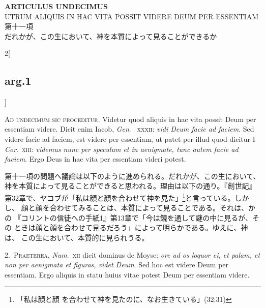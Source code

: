 \documentclass[paper=a4paper,fontsize=10pt,jafontsize=9pt,titlepage]{jlreq}
\begin{document}
\newpage
{}

\begin{center}
 {\Large {\bfseries ARTICULUS UNDECIMUS}}\\
 {\large UTRUM ALIQUIS IN HAC VITA POSSIT VIDERE DEUM PER ESSENTIAM\\
第十一項\\
だれかが、この生において、神を本質によって見ることができるか}
\end{center}

{}
\setcounter{section}{11}
\setcounter{subsection}{0}

\begin{paracol}{2}[\subsection{arg.1}]

{\scshape Ad undecimum sic proceditur}. Videtur quod aliquis in hac vita
possit Deum per essentiam videre. Dicit enim Iacob, {\itshape Gen}.~{\scshape
xxxii}: {\itshape vidi Deum facie ad faciem}. Sed videre facie ad faciem,
est videre per essentiam, ut patet per illud quod dicitur I {\itshape
Cor}.~{\scshape xiii}: {\itshape videmus nunc per speculum et in aenigmate, tunc
autem facie ad faciem}. Ergo Deus in hac vita per essentiam videri
potest.

\switchcolumn

第十一項の問題へ議論は以下のように進められる。だれかが、この生において、
神を本質によって見ることができると思われる。理由は以下の通り。『創世記』
第32章で、ヤコブが「私は顔と顔を合わせて神を見た」\footnote{「私は顔と顔
を合わせて神を見たのに、なお生きている」(32:31)}と言っている。しかし、
顔と顔を合わせてみることは、本質によって見ることである。それは、かの
『コリントの信徒への手紙1』第13章で「今は鏡を通して謎の中に見るが、その
ときは顔と顔を合わせて見るだろう」によって明らかである。ゆえに、神は、
この生において、本質的に見られうる。


2.~{\scshape Praeterea}, {\itshape Num}.~{\scshape xii} dicit dominus de Moyse: {\itshape
 ore ad os loquor ei, et palam, et non per aenigmata et figuras, videt
 Deum}. Sed hoc est videre Deum per essentiam. Ergo aliquis in statu
 huius vitae potest Deum per essentiam videre.


\end{paracol}
\end{document}
